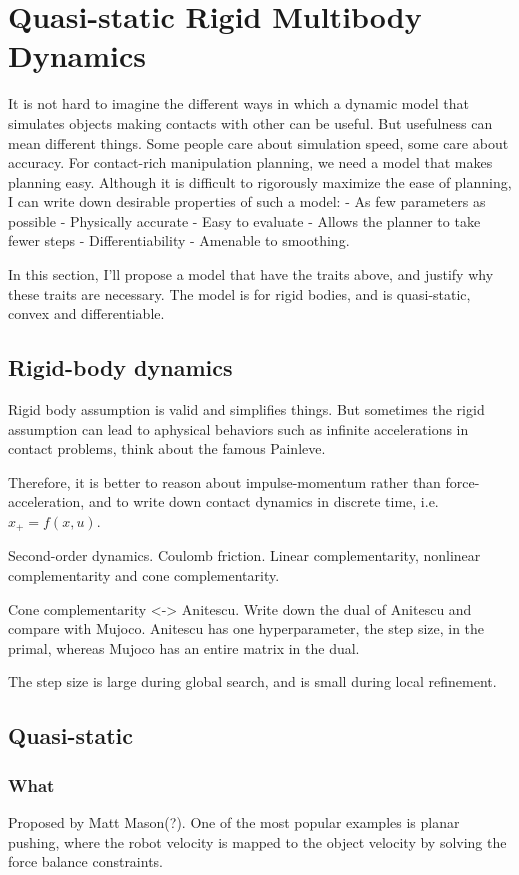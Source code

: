 \chapter{Quasi-static Rigid Multibody Dynamics}

It is not hard to imagine the different ways in which a dynamic model that simulates objects making contacts with other can be useful. But usefulness can mean different things. Some people care about simulation speed, some care about accuracy. For contact-rich manipulation planning, we need a model that makes planning easy. Although it is difficult to rigorously maximize the ease of planning, I can write down desirable properties of such a model: 
- As few parameters as possible
- Physically accurate
- Easy to evaluate
- Allows the planner to take fewer steps
- Differentiability
- Amenable to smoothing. 

In this section, I'll propose a model that have the traits above, and justify why these traits are necessary. The model is for rigid bodies, and is quasi-static, convex and differentiable.

\section{Rigid-body dynamics}
Rigid body assumption is valid and simplifies things. But sometimes the rigid assumption can lead to aphysical behaviors such as infinite accelerations in contact problems, think about the famous Painleve. 

Therefore, it is better to reason about impulse-momentum rather than force-acceleration, and to write down contact dynamics in discrete time, i.e. $x_{+} = f(x, u)$. 

Second-order dynamics.
Coulomb friction.
Linear complementarity, nonlinear complementarity and cone complementarity.

Cone complementarity <-> Anitescu.
Write down the dual of Anitescu and compare with Mujoco.
Anitescu has one hyperparameter, the step size, in the primal, whereas Mujoco has an entire matrix in the dual.

The step size is large during global search, and is small during local refinement. 

\section{Quasi-static}
\subsection{What}
Proposed by Matt Mason(?). One of the most popular examples is planar pushing, where the robot velocity is mapped to the object velocity by solving the force balance constraints. 

